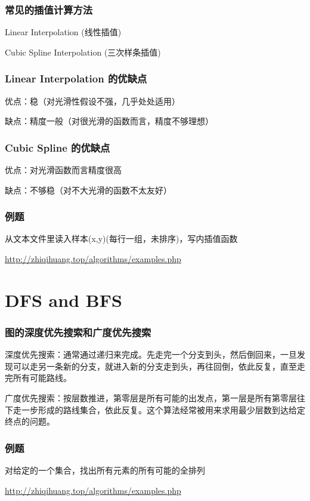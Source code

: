 \documentclass[CJK,14pt]{beamer}
\begin{document}
  \begin{frame}
    \frametitle{常见的插值计算方法}
    \bitem
  \item{Linear Interpolation (线性插值)}
  \item{Cubic Spline Interpolation (三次样条插值)}
    \eitem
  \end{frame}


  \begin{frame}
    \frametitle{Linear Interpolation 的优缺点}
    \bitem
  \item{优点：稳（对光滑性假设不强，几乎处处适用）}
  \item{缺点：精度一般（对很光滑的函数而言，精度不够理想）}
    \eitem
  \end{frame}


  \begin{frame}
    \frametitle{Cubic Spline 的优缺点}
    \bitem
  \item{优点：对光滑函数而言精度很高}
  \item{缺点：不够稳（对不大光滑的函数不太友好）}
    \eitem
  \end{frame}

    \begin{frame}
    \frametitle{例题}
    从文本文件里读入样本(x,y)(每行一组，未排序)，写内插值函数

    \url{http://zhiqihuang.top/algorithms/examples.php}
  \end{frame}

  
  \section{DFS and BFS}

  \begin{frame}
    \frametitle{图的深度优先搜索和广度优先搜索}
    \bitem
  \item{深度优先搜索：通常通过递归来完成。先走完一个分支到头，然后倒回来，一旦发现可以走另一条新的分支，就进入新的分支走到头，再往回倒，依此反复，直至走完所有可能路线。}
  \item{广度优先搜索：按层数推进，第零层是所有可能的出发点，第一层是所有第零层往下走一步形成的路线集合，依此反复。这个算法经常被用来求用最少层数到达给定终点的问题。}
    \eitem
  \end{frame}

  \begin{frame}
    \frametitle{例题}
    对给定的一个集合，找出所有元素的所有可能的全排列

    \url{http://zhiqihuang.top/algorithms/examples.php}    
  \end{frame}
\end{document}
